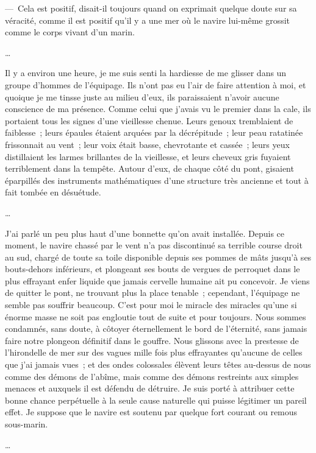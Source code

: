 \documentclass[french,twoside]{book} %
\begin{document}
— Cela est positif, disait-il toujours quand on exprimait quelque doute sur sa véracité, comme il est positif qu’il y a une mer où le navire lui-même grossit comme le corps vivant d’un marin.\par
…\par
\noindent Il y a environ une heure, je me suis senti la hardiesse de me glisser dans un groupe d’hommes de l’équipage. Ils n’ont pas eu l’air de faire attention à moi, et quoique je me tinsse juste au milieu d’eux, ils paraissaient n’avoir aucune conscience de ma présence. Comme celui que j’avais vu le premier dans la cale, ils portaient tous les signes d’une vieillesse chenue. Leurs genoux tremblaient de faiblesse ; leurs épaules étaient arquées par la décrépitude ; leur peau ratatinée frissonnait au vent ; leur voix était basse, chevrotante et cassée ; leurs yeux distillaient les larmes brillantes de la vieillesse, et leurs cheveux gris fuyaient terriblement dans la tempête. Autour d’eux, de chaque côté du pont, gisaient éparpillés des instruments mathématiques d’une structure très ancienne et tout à fait tombée en désuétude.\par
…\par
\noindent J’ai parlé un peu plus haut d’une bonnette qu’on avait installée. Depuis ce moment, le navire chassé par le vent n’a pas discontinué sa terrible course droit au sud, chargé de toute sa toile disponible depuis ses pommes de mâts jusqu’à ses bouts-dehors inférieurs, et plongeant ses bouts de vergues de perroquet dans le plus effrayant enfer liquide que jamais cervelle humaine ait pu concevoir. Je viens de quitter le pont, ne trouvant plus la place tenable ; cependant, l’équipage ne semble pas souffrir beaucoup. C’est pour moi le miracle des miracles qu’une si énorme masse ne soit pas engloutie tout de suite et pour toujours. Nous sommes condamnés, sans doute, à côtoyer éternellement le bord de l’éternité, sans jamais faire notre plongeon définitif dans le gouffre. Nous glissons avec la prestesse de l’hirondelle de mer sur des vagues mille fois plus effrayantes qu’aucune de celles que j’ai jamais vues ; et des ondes colossales élèvent leurs têtes au-dessus de nous comme des démons de l’abîme, mais comme des démons restreints aux simples menaces et auxquels il est défendu de détruire. Je suis porté à attribuer cette bonne chance perpétuelle à la seule cause naturelle qui puisse légitimer un pareil effet. Je suppose que le navire est soutenu par quelque fort courant ou remous sous-marin.\par
…\par
\end{document}

